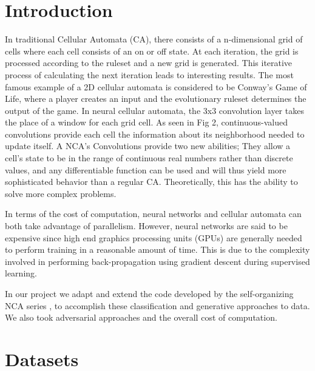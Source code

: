 \documentclass[conference]{IEEEtran}
\begin{document}
\section{Introduction}

In traditional Cellular Automata (CA), there consists of a n-dimensional grid of cells where each cell consists of an on or off state. At each iteration, the grid is processed according to the ruleset and a new grid is generated. This iterative process of calculating the next iteration leads to interesting results. The most famous example of a 2D cellular automata is considered to be Conway's Game of Life, where a player creates an input and the evolutionary ruleset determines the output of the game. In neural cellular automata, the 3x3 convolution layer takes the place of a window for each grid cell. As seen in Fig 2, continuous-valued convolutions provide each cell the information about its neighborhood needed to update itself. A NCA's Convolutions provide two new abilities; They allow a cell's state to be in the range of continuous real numbers rather than discrete values, and any differentiable function can be used and will thus yield more sophisticated behavior than a regular CA. Theoretically, this has the ability to solve more complex problems. 

In terms of the cost of computation, neural networks and cellular automata can both take advantage of parallelism. However, neural networks are said to be expensive since high end graphics processing units (GPUs) are generally needed to perform training in a reasonable amount of time. This is due to the complexity involved in performing back-propagation using gradient descent during supervised learning.

In our project we adapt and extend the code developed by the self-organizing NCA series \cite{selforg}, to accomplish these classification and generative approaches to data. We also took adversarial approaches and the overall cost of computation.



\section{Datasets}
\end{document}

